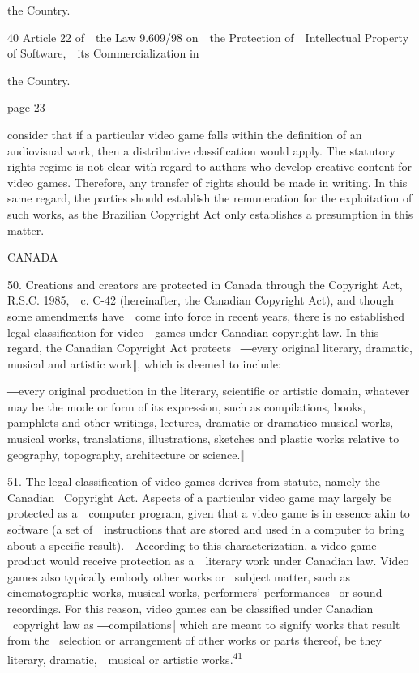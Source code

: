 \documentclass[
]{article}
\begin{document}
{the Country}{.}

{40 }{Article 22 of~~the }{Law 9.609/98 on~~the Protection
of~~Intellectual Property of Software,~~its Commercialization in}

{the Country}{.}

{page 23}

{consider that if a particular video game falls within the definition of
an a}{udiovisual work}{, then a distributive classification would apply.
The statutory rights regime is not clear with regard to authors who
develop creative content for video games. Therefore, any transfer of
rights should be made in writing. In this same regard, the parties
should establish the remuneration for the exploitation of such works, as
the Brazilian }{Copyright Act }{only establishes a presumption in this
matter.}

{CANADA}

{50. }{Creations and creators are protected in Canada through the
}{Copyright Act, }{R.S.C. 1985,~~c. C-42 (hereinafter, the Canadian
}{Copyright Act}{), and though some amendments have~~come into force in
recent years, there is no established legal classification for
video~~games under Canadian copyright law. In this regard, the Canadian
}{Copyright Act }{protects }{~―every original literary, dramatic,
musical and artistic work‖, which is deemed to include:}

{―}{every original production in the literary, scientific or artistic
domain, whatever may be the mode or form of its expression, such as
compilations, books, pamphlets and other writings, lectures, dramatic or
dramatico-musical works, musical works, translations, illustrations,
sketches and plastic works relative to geography, topography,
architecture or science.}{‖}

{51. }{The legal classification of video games derives from statute,
namely the Canadian }{~Copyright Act}{. Aspects of a particular video
game may largely be protected as a~~computer program, given that a video
game is in essence akin to software (a set of~~instructions that are
stored and used in a computer to bring about a specific
result).~~According to this characterization, a video game product would
receive protection as a~~literary work under Canadian law. Video games
also typically embody other works or }{~subject matter, such as
cinematographic works, musical works, performers' performances }{~or
sound recordings. For this reason, video games can be classified under
Canadian }{~copyright law as ―compilations‖ which are meant to signify
works that result from the }{~selection or arrangement of other works or
parts thereof, be they literary, dramatic,~~musical or artistic
works.}\textsuperscript{{41}}
\end{document}
